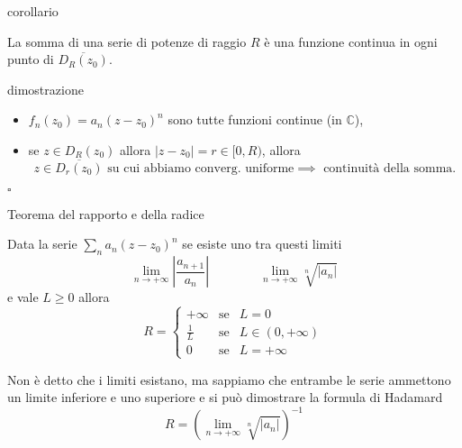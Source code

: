 \documentclass[x11names]{article}
\newcommand*{\QEDB}{\null\nobreak\hfill\ensuremath{\square}}%
\newcommand{\teorema}[2]{
	\begin{center}
		\fboxsep11pt
		\colorbox{myred}{\begin{minipage}{5.75in}
				\begin{redes}{#1}
					#2
				\end{redes}
		\end{minipage}}
	\end{center}
}
\newcommand{\dimostrazione}[2]{
	\begin{dym}{dimostrazione#1}
		#2
		\QEDB
	\end{dym}
}
\newcommand{\corollario}[2]{
	\begin{center}
		\begin{coroll}{corollario#1}
			#2
		\end{coroll}
	\end{center}
}
\begin{document}
\corollario{}{
La somma di una serie di potenze di raggio \(R\) è una funzione continua in ogni punto di \(\overline{D_R(z_0)}\).
}
\dimostrazione{}{
\begin{itemize}
	\item \(f_n(z_0) = a_n(z-z_0)^n\) sono tutte funzioni continue (in \(\mathbb{C}\)),
	\item se \(z \in D_R(z_0)\) allora \(|z-z_0| = r \in [0,R)\), allora 
	\[
	 z \in \overline{D_r(z_0)} \text{ su cui abbiamo converg. uniforme} \implies \text{ continuità della somma}.
	\]
\end{itemize}
}

\teorema{Teorema del rapporto e della radice}{
Data la serie \(\sum_n a_n(z-z_0)^n\) se esiste uno tra questi limiti 
\[
\lim_{n\to + \infty}\left|\frac{a_{n+1}}{a_n}\right| \qquad \qquad \lim_{n\to + \infty}\sqrt[n]{|a_n|}
\]
e vale \(L\geq 0\) allora
\[
R = \left\{\begin{array}{lcl}
	+\infty & \text{se} & L = 0 \\
	\frac{1}{L} & \text{se} & L \in (0,+\infty) \\
	0 & \text{se} & L = +\infty 
\end{array}\right.
\] 
}
Non è detto che i limiti esistano, ma sappiamo che entrambe le serie ammettono un limite inferiore e uno superiore e si può dimostrare la formula di Hadamard
\[
R = \left(\lim_{n\to + \infty}\sqrt[n]{|a_n|}\right)^{-1}
\]
	
\end{document}
